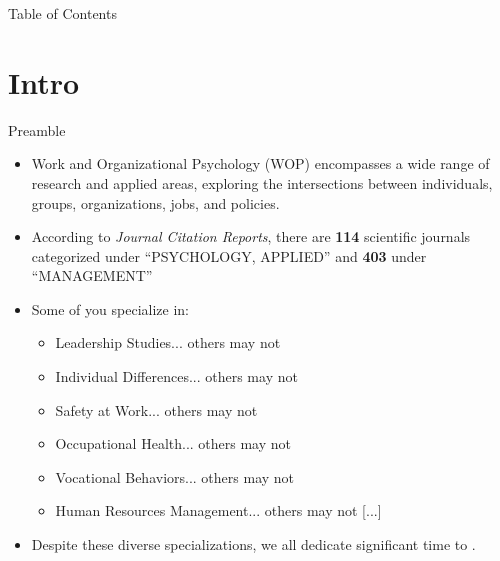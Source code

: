 \documentclass{beamer}
\begin{document}



\begin{frame}{Table of Contents}
    \tableofcontents
\end{frame}




\section{Intro}


\begin{frame}{Preamble}
    \begin{itemize}
        \item<1> Work and Organizational Psychology (WOP) encompasses a wide range of research and applied areas, exploring the intersections between individuals, groups, organizations, jobs, and policies.
        \item<2> According to \textit{Journal Citation Reports}, there are \textbf{114} scientific journals categorized under ``PSYCHOLOGY, APPLIED'' and \textbf{403} under ``MANAGEMENT''
        \item<3> Some of you specialize in:
            \begin{itemize}
                \item Leadership Studies... others may not
                \item Individual Differences... others may not
                \item Safety at Work... others may not
                \item Occupational Health... others may not
                \item Vocational Behaviors... others may not
                \item Human Resources Management... others may not [...]
            \end{itemize}
        \item<4> Despite these diverse specializations, we all dedicate significant time to .
    \end{itemize}
\end{frame}
\end{document}
